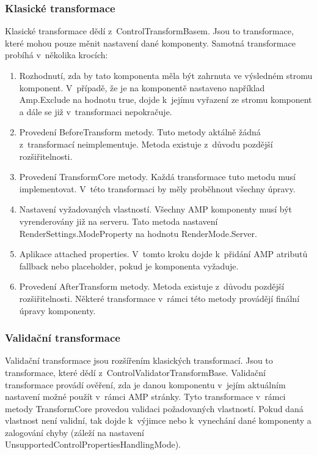 \subsubsection{Klasické transformace}
    Klasické transformace dědí z~ControlTransformBasem. Jsou to transformace, které mohou pouze měnit nastavení dané komponenty. Samotná transformace probíhá v~několika krocích:
    \begin{enumerate}
        \item Rozhodnutí, zda by tato komponenta měla být zahrnuta ve výsledném stromu komponent.\newline
        V~případě, že je na komponentě nastaveno například Amp.Exclude na hodnotu true, dojde k~jejímu vyřazení ze stromu komponent a dále se již v~transformaci nepokračuje.
        \item Provedení BeforeTransform metody.\newline
        Tuto metody aktálně žádná z~transformací neimplementuje. Metoda existuje z~důvodu pozdější rozšiřitelnosti.
        \item Provedení TransformCore metody.\newline
        Každá transformace tuto metodu musí implementovat. V~této transformaci by měly proběhnout všechny úpravy. 
        \item Nastavení vyžadovaných vlastností.\newline
        Všechny AMP komponenty musí být vyrenderovány již na serveru. Tato metoda nastavení RenderSettings.ModeProperty na hodnotu RenderMode.Server.
        \item Aplikace attached properties.\newline
        V~tomto kroku dojde k~přidání AMP atributů fallback nebo placeholder, pokud je komponenta vyžaduje.
        \item Provedení AfterTransform metody.\newline
        Metoda existuje z~důvodu pozdější rozšiřitelnosti. Některé transformace v~rámci této metody provádějí finální úpravy komponenty.
    \end{enumerate}
\subsubsection{Validační transformace}
    Validační transformace jsou rozšířením klasických transformací. Jsou to transformace, které dědí z~ControlValidatorTransformBase. Validační transformace provádí ověření, zda je danou komponentu v~jejím aktuálním nastavení možné použít v~rámci AMP stránky. Tyto transformace v~rámci metody TransformCore provedou validaci požadovaných vlastností. Pokud daná vlastnost není validní, tak dojde k~výjimce nebo k~vynechání dané komponenty a zalogování chyby (záleží na nastavení UnsupportedControlPropertiesHandlingMode).
